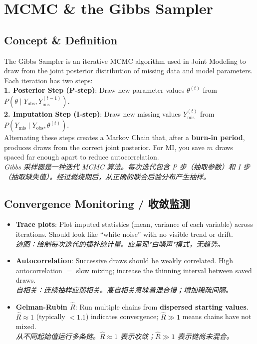\documentclass[9pt, a4paper]{article}
\begin{document}
\section{MCMC \& the Gibbs Sampler}

\subsection{Concept \& Definition}
\begin{tcolorbox}[defbox]
    The Gibbs Sampler is an iterative MCMC algorithm used in Joint Modeling to draw from the joint posterior distribution of missing data and model parameters. Each iteration has two steps:\\[3pt]
    \textbf{1. Posterior Step (P-step)}: Draw new parameter values $\theta^{(t)}$ from $P(\theta \mid Y_{\text{obs}}, Y_{\text{mis}}^{(t-1)})$.\\
    \textbf{2. Imputation Step (I-step)}: Draw new missing values $Y_{\text{mis}}^{(t)}$ from $P(Y_{\text{mis}} \mid Y_{\text{obs}}, \theta^{(t)})$.\\[3pt]
    Alternating these steps creates a Markov Chain that, after a \textbf{burn-in period}, produces draws from the correct joint posterior. For MI, you save $m$ draws spaced far enough apart to reduce autocorrelation.\\
    \textit{Gibbs 采样器是一种迭代 MCMC 算法。每次迭代包含 P 步（抽取参数）和 I 步（抽取缺失值）。经过燃烧期后，从正确的联合后验分布产生抽样。}
\end{tcolorbox}

\subsection{Convergence Monitoring / 收敛监测}
\begin{itemize}
    \item \textbf{Trace plots}: Plot imputed statistics (mean, variance of each variable) across iterations. Should look like ``white noise'' with no visible trend or drift.\\
    \textit{迹图：绘制每次迭代的插补统计量。应呈现"白噪声"模式，无趋势。}
    \item \textbf{Autocorrelation}: Successive draws should be weakly correlated. High autocorrelation $=$ slow mixing; increase the thinning interval between saved draws.\\
    \textit{自相关：连续抽样应弱相关。高自相关意味着混合慢；增加稀疏间隔。}
    \item \textbf{Gelman-Rubin $\hat{R}$}: Run multiple chains from \textbf{dispersed starting values}. $\hat{R} \approx 1$ (typically $< 1.1$) indicates convergence; $\hat{R} \gg 1$ means chains have not mixed.\\
    \textit{从不同起始值运行多条链。$\hat{R} \approx 1$ 表示收敛；$\hat{R} \gg 1$ 表示链尚未混合。}
\end{itemize}
\end{document}
